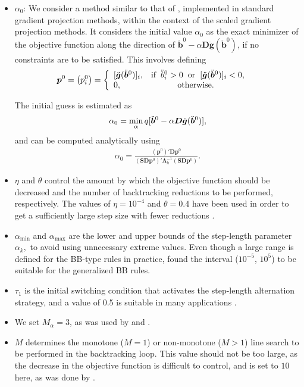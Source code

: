 \documentclass[11pt]{article}
\newcommand{\0}{\phantom{0}}
\begin{document}
\begin{itemize}
	\item $\alpha_0$: We consider a method similar to that of \citet{Figueiredo2007}, implemented in standard gradient projection methods, within the context of the scaled gradient projection methods. It considers the initial value $\alpha_{0}$ as the exact minimizer of the objective function along the direction of $\ddot{\bm{b}}^{0} - \alpha \bm{D} \ddot{\bm{g}}(\ddot{\bm{b}}^{0})$, if no constraints are to be satisfied. This involves defining
	\begin{align*}
	\bm{p}^{0} = \left(p^{0}_{i}\right)& =
	\left\{\begin{array}{ll}
	[\ddot{\bm{g}}(\ddot{\bm{b}}^{0})]_{i}, & \mbox{$\text{if} \hspace{2mm} \ddot{b}_{i}^{0} > 0 \hspace{2mm} \text{or} \hspace{2mm} [\ddot{\bm{g}}(\ddot{\bm{b}}^{0})]_{i} < 0,$}\\
	0, & \mbox{\hspace{1cm} \text{otherwise}}.
	\end{array}\right.
	\end{align*}
	
	The initial guess is estimated as 
	\begin{align*}
	\alpha_{0} = \operatornamewithlimits{min}_{\alpha} q[\ddot{\bm{b}}^{0} - \alpha \bm{D} \ddot{\bm{g}}(\ddot{\bm{b}}^{0})],
	\end{align*}
	and can be computed analytically using
	\begin{align*}
	\alpha_{0} = \frac{(\bm{p}^{0})'\bm{D}\bm{p}^{0}}{(\bm{S}\bm{D}\bm{p}^{0})'\bm{\Lambda}_{h}^{-1}(\bm{S}\bm{D}\bm{p}^{0})}.
	\end{align*}
	\item $\eta$ and $\theta$ control the amount by which the objective function should be decreased and the number of backtracking reductions to be performed, respectively. The values of $\eta = 10^{-4}$ and $\theta = 0.4$ have been used in order to get a sufficiently large step size with fewer reductions \citep{Bonettini2009}.
	\item $\alpha_{\text{min}}$ and $\alpha_{\text{max}}$ are the lower and upper bounds of the step-length parameter $\alpha_{k},$ to avoid using unnecessary extreme values. Even though a large range is defined for the BB-type rules in practice, \citet{Bertero2013} found the interval ($10^{-5}$, $10^{5}$) to be suitable for the generalized BB rules.
	\item $\tau_{1}$ is the initial switching condition that activates the step-length alternation strategy, and a value of 0.5 is suitable in many applications \citep{Bonettini2009, Bertero2013}.
	\item We set $M_{\alpha} = 3$, as was used by \citet{Bonettini2009} and \citet{Bertero2013}.
	\item $M$ determines the monotone ($M =1$) or non-monotone ($M > 1$) line search to be performed in the backtracking loop. This value should not be too large, as the decrease in the objective function is difficult to control, and is set to $10$ here, as was done by \citet{Bonettini2009}. 
\end{itemize}
\end{document}

